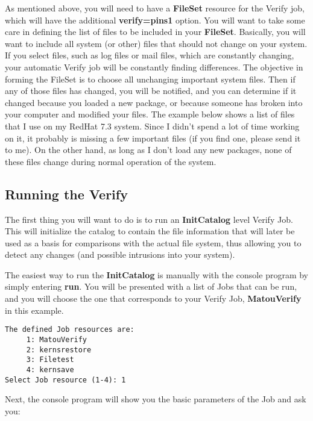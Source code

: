 As mentioned above, you will need to have a {\bf FileSet} resource for the
Verify job, which will have the additional {\bf verify=pins1} option. You will
want to take some care in defining the list of files to be included in your
{\bf FileSet}. Basically, you will want to include all system (or other) files
that should not change on your system. If you select files, such as log files
or mail files, which are constantly changing, your automatic Verify job will
be constantly finding differences. The objective in forming the FileSet is to
choose all unchanging important system files. Then if any of those files has
changed, you will be notified, and you can determine if it changed because you
loaded a new package, or because someone has broken into your computer and
modified your files. The example below shows a list of files that I use on my
RedHat 7.3 system. Since I didn't spend a lot of time working on it, it
probably is missing a few important files (if you find one, please send it to
me). On the other hand, as long as I don't load any new packages, none of
these files change during normal operation of the system. 

\subsection*{Running the Verify}

The first thing you will want to do is to run an {\bf InitCatalog} level
Verify Job. This will initialize the catalog to contain the file information
that will later be used as a basis for comparisons with the actual file
system, thus allowing you to detect any changes (and possible intrusions into
your system). 

The easiest way to run the {\bf InitCatalog} is manually with the console
program by simply entering {\bf run}. You will be presented with a list of
Jobs that can be run, and you will choose the one that corresponds to your
Verify Job, {\bf MatouVerify} in this example. 

\footnotesize
\begin{verbatim}
The defined Job resources are:
     1: MatouVerify
     2: kernsrestore
     3: Filetest
     4: kernsave
Select Job resource (1-4): 1
\end{verbatim}
\normalsize

Next, the console program will show you the basic parameters of the Job and
ask you: 

